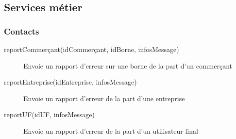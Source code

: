 \subsection{Services métier}
% 


\subsubsection{Contacts}
\begin{description}
  \item[reportCommerçant(idCommerçant, idBorne, infosMessage)] Envoie un
    rapport d'erreur sur une borne de la part d'un commerçant
  \item[reportEntreprise(idEntreprise, infosMessage)] Envoie un rapport
    d'erreur de la part d'une entreprise
  \item[reportUF(idUF, infosMessage)] Envoie un rapport d'erreur de la part
    d'un utilisateur final
\end{description}

